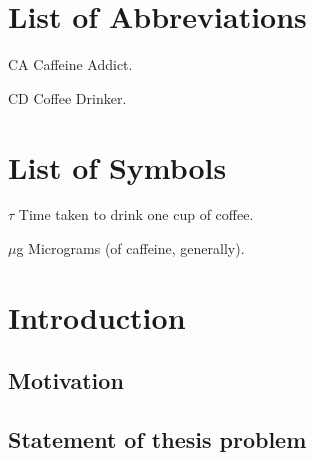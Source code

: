 \documentclass[edeposit,fullpage,draftthesis]{uiucthesis2009}
\begin{document}

\setcounter{tocdepth}{2}

\tableofcontents
\listoftables
\listoffigures

\chapter{List of Abbreviations}

\begin{symbollist*}
\item[CA] Caffeine Addict.
\item[CD] Coffee Drinker.
\end{symbollist*}

\chapter{List of Symbols}

\begin{symbollist}[0.7in]
\item[$\tau$] Time taken to drink one cup of coffee.
\item[$\mu$g] Micrograms (of caffeine, generally).
\end{symbollist}

\mainmatter
\chapter{Introduction}

    \section{Motivation}
    \section{Statement of thesis problem}
\end{document}

